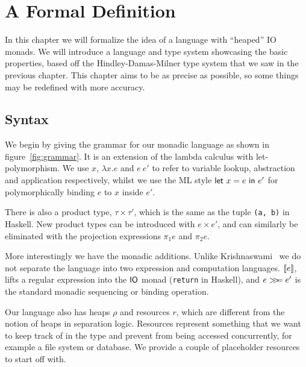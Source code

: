 \chapter{A Formal Definition}\label{chapter:system}

In this chapter we will formalize the idea of a language with
``heaped'' IO monads. We will introduce a language and type system
showcasing the basic properties, based off the Hindley-Damas-Milner
type system that we saw in the previous chapter. This chapter aims to
be as precise as possible, so some things may be redefined with more accuracy.

\section{Syntax}

\setlength{\grammarparsep}{20pt plus 1pt minus 1pt} %
\setlength{\grammarindent}{12em} %
\renewcommand{\syntleft}{}
\renewcommand{\syntright}{}



\def\defaultHypSeparation{\hskip .05in}

We begin by giving the grammar for our monadic language as shown in
figure~\ref{fig:grammar}.  It is an extension of the lambda calculus
with let-polymorphism.  We use $x$, $\lambda x . e$ and $e \ e'$ to refer to
variable lookup, abstraction and application respectively, whilst we
use the ML style $\mathsf{let} \ x = e \ \mathsf{in} \ e'$ for polymorphically binding $e$
to $x$ inside $e'$.

There is also a product type, $\tau \times \tau'$, which is the same as the tuple
\texttt{(a, b)} in Haskell. New product types can be introduced with
$e \times e'$, and can similarly be eliminated with the projection
expressions $\pi_1 e$ and $\pi_2 e$.

More interestingly we have the monadic additions. Unlike
Krishnaswami~\cite{krishnaswami2006} we do not separate the language
into two expression and computation languages. $[\![ e]\!]$, lifts a
regular expression into the $\mathsf{IO}$ monad (\texttt{return} in Haskell), and
$e >\!\!>\!\!= e'$ is the standard monadic sequencing or binding operation.

Our language also has heaps $\rho$ and resources $r$, which are different from the
notion of heaps in separation logic. Resources represent something
that we want to keep track of in the type and prevent from being
accessed concurrently, for example a file system or database. We
provide a couple of placeholder resources to start off with.


